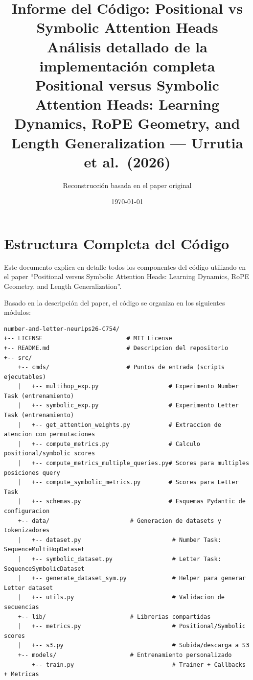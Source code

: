 \documentclass[12pt,a4paper]{report}
\title{%
  {\huge \textbf{Informe del Código}: Positional vs Symbolic Attention Heads}\\[0.5cm]
  {\large Análisis detallado de la implementación completa}\\[0.3cm]
  {\normalsize Positional versus Symbolic Attention Heads: Learning Dynamics, RoPE Geometry, and Length Generalization --- Urrutia et al.~(2026)}
}
\author{Reconstrucción basada en el paper original}
\date{\today}
\begin{document}
\maketitle
\tableofcontents
\clearpage

\section{Estructura Completa del Código}
\label{sec:estructura}

Este documento explica en detalle todos los componentes del código utilizado en el paper ``Positional versus Symbolic Attention Heads: Learning Dynamics, RoPE Geometry, and Length Generalization''.

Basado en la descripción del paper, el código se organiza en los siguientes módulos:

\begin{verbatim}
number-and-letter-neurips26-C754/
+-- LICENSE                        # MIT License
+-- README.md                      # Descripcion del repositorio
+-- src/
    +-- cmds/                      # Puntos de entrada (scripts ejecutables)
    |   +-- multihop_exp.py                    # Experimento Number Task (entrenamiento)
    |   +-- symbolic_exp.py                    # Experimento Letter Task (entrenamiento)
    |   +-- get_attention_weights.py           # Extraccion de atencion con permutaciones
    |   +-- compute_metrics.py                 # Calculo positional/symbolic scores
    |   +-- compute_metrics_multiple_queries.py# Scores para multiples posiciones query
    |   +-- compute_symbolic_metrics.py        # Scores para Letter Task
    |   +-- schemas.py                         # Esquemas Pydantic de configuracion
    +-- data/                       # Generacion de datasets y tokenizadores
    |   +-- dataset.py                          # Number Task: SequenceMultiHopDataset
    |   +-- symbolic_dataset.py                 # Letter Task: SequenceSymbolicDataset
    |   +-- generate_dataset_sym.py             # Helper para generar Letter dataset
    |   +-- utils.py                            # Validacion de secuencias
    +-- lib/                        # Librerias compartidas
    |   +-- metrics.py                          # Positional/Symbolic scores
    |   +-- s3.py                               # Subida/descarga a S3
    +-- models/                     # Entrenamiento personalizado
        +-- train.py                            # Trainer + Callbacks + Metricas
\end{verbatim}
\end{document}
